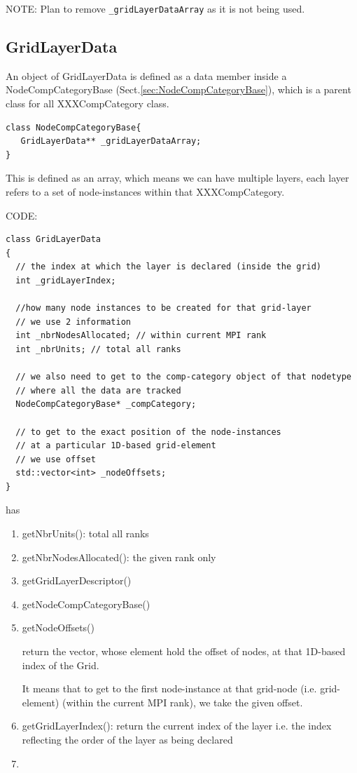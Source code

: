 NOTE: Plan to remove \verb!_gridLayerDataArray! as it is not being used.

\subsection{GridLayerData}
\label{sec:GridLayerData}	

An object of GridLayerData is defined as a data member inside a
NodeCompCategoryBase (Sect.\ref{sec:NodeCompCategoryBase}), which is a parent
class for all XXXCompCategory class. 
\begin{lstlisting}
class NodeCompCategoryBase{
   GridLayerData** _gridLayerDataArray;
}
\end{lstlisting}

This is defined as an array, which means we can have multiple layers,
each layer refers to a set of node-instances within that XXXCompCategory.

CODE:
\begin{lstlisting}
class GridLayerData
{
  // the index at which the layer is declared (inside the grid)
  int _gridLayerIndex;

  //how many node instances to be created for that grid-layer
  // we use 2 information
  int _nbrNodesAllocated; // within current MPI rank
  int _nbrUnits; // total all ranks
  
  // we also need to get to the comp-category object of that nodetype
  // where all the data are tracked
  NodeCompCategoryBase* _compCategory;
  
  // to get to the exact position of the node-instances
  // at a particular 1D-based grid-element 
  // we use offset
  std::vector<int> _nodeOffsets;
}
\end{lstlisting}
has
\begin{enumerate}
  \item getNbrUnits(): total all ranks
  
  \item getNbrNodesAllocated(): the given rank only
  
  \item getGridLayerDescriptor()
  
  \item getNodeCompCategoryBase()
  
  \item getNodeOffsets()
  
  return the vector, whose element hold the offset of nodes, at that 1D-based
  index of the Grid.
  
  It means that to get to the first node-instance at that grid-node (i.e. grid-element) (within
  the current MPI rank), we take the given offset.
  
  \item getGridLayerIndex(): return the current index of the layer
  i.e. the index reflecting the order of the layer as being declared
  
  \item 
\end{enumerate}

